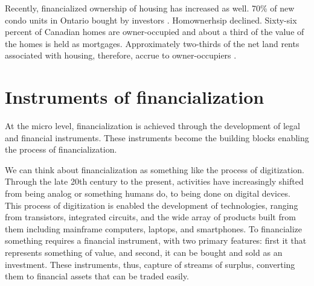 Recently, financialized ownership of housing has increased as well.
70\% of new condo units in Ontario bought by investors \cite{}. Homownerhsip declined. Sixty-six percent of Canadian homes are owner-occupied and about a third of the value of the homes is held as mortgages. Approximately two-thirds of the net land rents associated with housing, therefore, accrue to owner-occupiers \cite{nemtinFinancializationHousingSocial2021}. %

\section{Instruments of financialization }
At the  micro level, financialization is achieved through the development of legal and financial instruments. These instruments become the building blocks enabling the process of financialization. 
 
We can think about financialization as something like the process of \gls{digitization}. 
Through the late 20th century to the present, activities have increasingly shifted from being analog or something humans do, to being done on digital devices. This process of digitization is enabled the development of technologies, ranging from  transistors, integrated circuits, and the wide array of products built from them including mainframe computers, laptops, and smartphones.  
To financialize something requires a \gls{financial instrument}, with two primary features: first it that represents something of value, and second, it can be bought and sold as an investment. These instruments, thus, capture of streams of surplus, converting them to financial assets that can be traded easily. 

